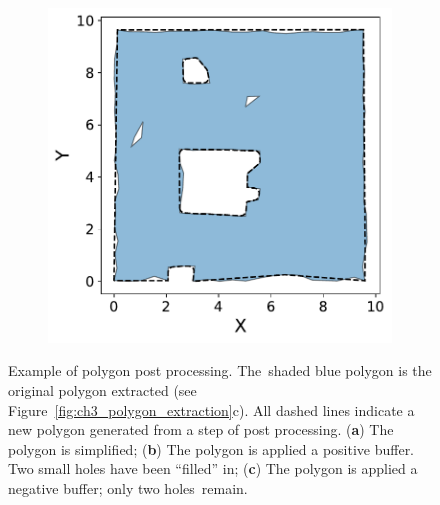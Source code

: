 \begin{figure}[!ht]
\begin{subfigure}[t]{.30\linewidth}
    \caption{\label{fig:ch3_polygon_post_b}}
  \end{subfigure}
  \hfill
  \begin{subfigure}[t]{.30\linewidth}
    \centering\includegraphics[clip,trim=0cm 0cm 0cm 0cm,width=.99\linewidth]{chapter_3_polylidar3d/imgs/polygon/PolygonExtraction_e.pdf}
    \caption{\label{fig:ch3_polygon_post_c}}
  \end{subfigure}
  \caption[Example of polygon post processing]{Example of polygon post processing. The~shaded blue polygon is the original polygon extracted (see Figure~\ref{fig:ch3_polygon_extraction}c). All dashed lines indicate a new polygon generated from a step of post processing. (\textbf{a}) The polygon is simplified; (\textbf{b}) The polygon is applied a positive buffer. Two small holes have been ``filled'' in; (\textbf{c}) The polygon is applied a negative buffer; only two holes~remain. }\label{fig:ch3_polygon_post}
\end{figure}
\unskip





